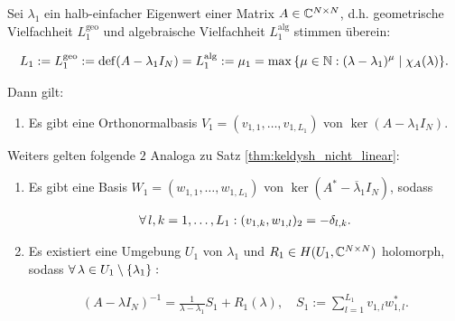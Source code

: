 \begin{proposition} \label{prop:keldysh_linear}

    Sei $\lambda_1$ ein halb-einfacher Eigenwert einer Matrix $A \in \mathbb{C}^{N \times N}$, d.h. geometrische Vielfachheit $L_1^\mathrm{geo}$ und algebraische Vielfachheit $L_1^\mathrm{alg}$ stimmen überein:

    \begin{align*}
        L_1
        :=
        L_1^\mathrm{geo} := \operatorname{def}(A - \lambda_1 I_N)
        =
        L_1^\mathrm{alg} := \mu_1 = \max {\left \{ \mu \in \mathbb{N}: (\lambda - \lambda_1)^\mu \mid \chi_A(\lambda) \right \}}.
    \end{align*}

    Dann gilt:

    \begin{enumerate}[label = (\roman*)]
        \item Es gibt eine Orthonormalbasis $V_1 = (v_{1, 1}, \dots, v_{1, L_1})$ von $\ker (A - \lambda_1 I_N)$.
    \end{enumerate}

    Weiters gelten folgende $2$ Analoga zu Satz \ref{thm:keldysh_nicht_linear}:

    \begin{enumerate}[label = (\roman*), start = 2]

        \item Es gibt eine Basis $W_1 = (w_{1, 1}, \dots, w_{1, L_1})$ von $\ker (A^\ast - \overline \lambda_1 I_N)$, sodass

        \begin{align*}
            \forall \, l, k = 1, \dots, L_1:
            (v_{1, k}, w_{1, l})_2 = -\delta_{l, k}.
        \end{align*}

        \item Es existiert eine Umgebung $U_1$ von $\lambda_1$ und $R_1 \in H(U_1, \mathbb{C}^{N \times N})$ holomorph, sodass $\forall \, \lambda \in U_1 \setminus {\left \{ \lambda_1 \right \}}:$

        \begin{align*}
            (A - \lambda I_N)^{-1}
            =
            \frac{1}{\lambda - \lambda_1} S_1
            +
            R_1(\lambda),
            \quad
            S_1
            :=
            \sum_{l=1}^{L_1}
                v_{1, l} w_{1, l}^\ast.
        \end{align*}

    \end{enumerate}

\end{proposition}
